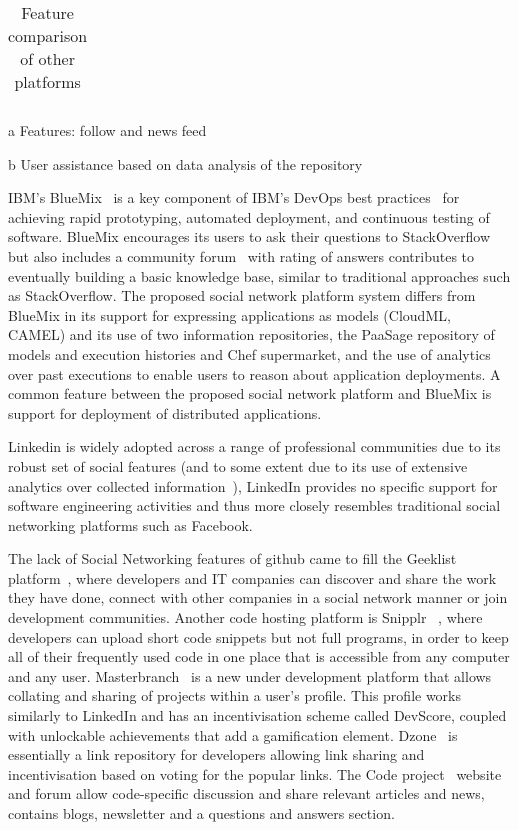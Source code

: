 \begin{table*}
\begin{threeparttable}
\begin{tabular}{c|c|c|c|c|c|c|c|c|c|cc}
\end{tabular}

\begin{tablenotes}
      \small
       \item[a] Features: follow and news feed
      \item[b] User assistance based on data analysis of the repository
\end{tablenotes}
\end{threeparttable}
\caption{Feature comparison of other platforms}\label{tab:related}
\end{table*}

IBM's BlueMix~\cite{Bluemix-dev} is a key component of IBM's DevOps best practices~\cite{ibm-devops} for achieving rapid prototyping, automated deployment, and continuous testing of software. BlueMix encourages its users to ask their questions to StackOverflow but also includes a community forum~\cite{Bluemix-dev} with rating of answers contributes to eventually building a basic knowledge base, similar to traditional approaches such as StackOverflow.  The proposed social network platform system differs from BlueMix in its support for expressing applications as models (CloudML, CAMEL) and its use of two information repositories, the PaaSage repository of models and execution histories and Chef supermarket, and the use of analytics over past executions to enable users to reason about application deployments. A common feature between the proposed social network platform and BlueMix is support for deployment of distributed applications. 

Linkedin is widely adopted across a range of professional communities due to its robust set of social features (and to some extent due to its use of extensive analytics over collected information~\cite{sumbaly2013big}), LinkedIn provides no specific support for software engineering activities and thus more closely resembles traditional social networking platforms such as Facebook.

The lack of Social Networking features of github came to fill the Geeklist platform~\cite{geeklist_url}, where developers and IT companies can discover and share the work they have done, connect with other companies in a social network manner or join development communities. Another code hosting platform is Snipplr ~\cite{snipplr_url}, where developers can upload short code snippets but not full programs, in order to keep all of their frequently used code in one place that is accessible from any computer and any user. Masterbranch~\cite{masterbranch_url} is a new under development platform that allows collating and sharing of projects within a user's profile. This profile works similarly to LinkedIn and has an incentivisation scheme called DevScore, coupled with unlockable achievements that add a gamification element. Dzone~\cite{dzone_url} is essentially a link repository for developers allowing link sharing and incentivisation based on voting for the popular links. The Code project~\cite{codeproject_url} website and forum allow code-specific discussion and share relevant articles and news, contains blogs, newsletter and a questions and answers section.


